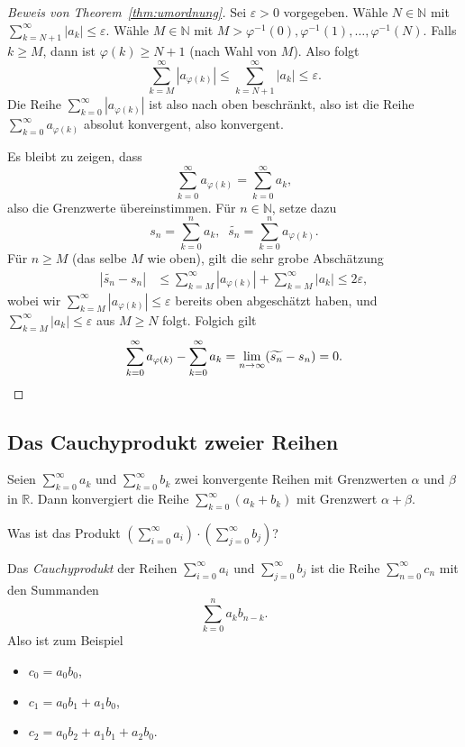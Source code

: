 \documentclass[../main.tex]{subfiles}
\begin{document}
\begin{proof}[Beweis von Theorem~\ref{thm:umordnung}]
  Sei $\varepsilon > 0$ 
  vorgegeben.
  Wähle $N \in \mathbb{N}$ 
  mit $\sum_{k=N+1}^{\infty} |a_k| \leq \varepsilon$.
  Wähle $M \in \mathbb{N}$ mit $M > \varphi^{-1}(0),
  \varphi^{-1}(1), \dots, \varphi^{-1}(N)$.
  Falls $k \geq M$, dann ist $\varphi(k) \geq N+1$
  (nach Wahl von $M$).
  Also folgt
  \[
   \sum_{k=M}^{\infty} |a_{\varphi(k)}| 
   \leq \sum_{k=N+1}^{\infty} |a_k| \leq \varepsilon.
  \]
  Die Reihe
  $\sum_{k=0}^{\infty} |a_{\varphi(k)}|$ ist also
  nach oben beschränkt,
  also ist die Reihe
  $\sum_{k=0}^{\infty} a_{\varphi(k)}$ absolut konvergent,
  also konvergent.

  Es bleibt zu zeigen, dass
  \[
    \sum_{k=0}^{\infty} a_{\varphi(k)} = \sum_{k=0}^{\infty} a_k,
  \]
  also die Grenzwerte übereinstimmen.
  Für $n \in \mathbb{N}$, setze dazu
  \[
    s_n = \sum_{k=0}^{n} a_k, \;\; \widetilde{s_n} =
    \sum_{k=0}^{n} a_{\varphi(k)}.
  \]
  Für $n \geq M$ (das selbe $M$ wie oben),
  gilt die sehr grobe Abschätzung
  \begin{align*}
    |\widetilde{s_n} - s_n| & \leq
    \sum_{k=M}^{\infty} |a_{\varphi(k)}|
    + \sum_{k=M}^{\infty} |a_k| \leq 2\varepsilon,
  \end{align*}
  wobei wir
  $\sum_{k=M}^{\infty} |a_{\varphi(k)}| \leq \varepsilon$ 
  bereits oben abgeschätzt haben,
  und $\sum_{k=M}^{\infty} |a_k| \leq \varepsilon$ aus
  $M \geq N$ folgt.
  Folgich gilt
  \[
    \sum_{k=0}^{\infty} a_{\varphi(k)}
    - \sum_{k=0}^{\infty} a_{k} =
    \lim_{n \to \infty}(\widetilde{s_n} - s_n) = 0. \qedhere
  \]
\end{proof}

\subsection*{Das Cauchyprodukt zweier Reihen}
Seien $\sum_{k=0}^{\infty} a_k$ und $\sum_{k=0}^{\infty} b_k$ 
zwei konvergente Reihen mit Grenzwerten
$\alpha$ und $\beta$ in $\mathbb{R}$.
Dann konvergiert die Reihe
$\sum_{k=0}^{\infty} (a_k + b_k)$ mit Grenzwert
$\alpha + \beta$.

\begin{question}
  Was ist das Produkt $\left( \sum_{i=0}^{\infty} a_i \right)
  \cdot \left( \sum_{j=0}^{\infty} b_j \right)$?
\end{question}

\begin{definition}
  Das \emph{Cauchyprodukt} der Reihen
  $\sum_{i=0}^{\infty} a_i$ und $\sum_{j=0}^{\infty} b_j$ 
  ist die Reihe $\sum_{n=0}^{\infty} c_n$ mit den Summanden
  \[
    \sum_{k=0}^{n} a_k b_{n-k}.
  \]
  Also ist zum Beispiel
  \begin{itemize}
    \item $c_0 = a_0 b_0$,
    \item $c_1 = a_0 b_1 + a_1 b_0$,
    \item $c_2 = a_0 b_2 + a_1 b_1 + a_2 b_0$.
  \end{itemize}
\end{definition}
\end{document}
